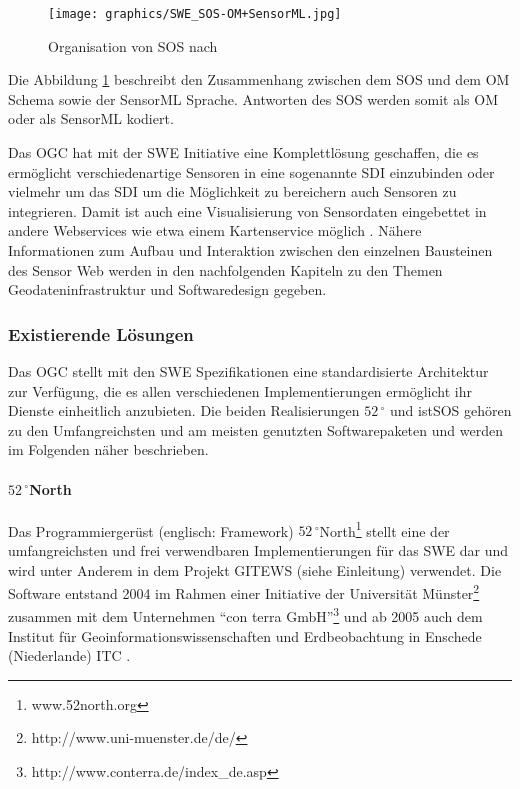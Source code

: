 \citep{botts_ogc_2008}\citep{woolf_gigas_2008}\citep{kunkel_teodoor:_2012}\citep{walkowski_sensor_2008}

\begin{figure}[H]
	\centering
 	 \texttt{[image: graphics/SWE\_SOS-OM+SensorML.jpg]} 
	\caption{Organisation von SOS nach \citep{ansorge_web_2012}}
	 \label{fig:swe_sos-om+sml}
\end{figure}

Die Abbildung \ref{fig:swe_sos-om+sml} beschreibt den Zusammenhang zwischen dem \gls{SOS} und dem \gls{OM} Schema sowie der \gls{SensorML} Sprache. Antworten des \gls{SOS} werden somit als \gls{OM} oder als \gls{SensorML} kodiert.

Das \gls{OGC} hat mit der \gls{SWE} Initiative eine Komplettlösung geschaffen, die es ermöglicht verschiedenartige Sensoren in eine sogenannte  \gls{SDI} einzubinden oder vielmehr um das \gls{SDI} um die Möglichkeit zu bereichern auch Sensoren zu integrieren. Damit ist auch eine Visualisierung von Sensordaten eingebettet in andere Webservices wie etwa einem Kartenservice möglich \citep{broring_new_2011}\citep{walkowski_sensor_2008}. Nähere Informationen zum Aufbau und Interaktion zwischen den einzelnen Bausteinen des Sensor Web werden in den nachfolgenden Kapiteln zu den Themen Geodateninfrastruktur und Softwaredesign gegeben.


\subsubsection{Existierende Lösungen}
Das \gls{OGC} stellt mit den \gls{SWE} Spezifikationen eine standardisierte Architektur zur Verfügung, die es allen verschiedenen Implementierungen ermöglicht ihr Dienste einheitlich anzubieten. Die beiden Realisierungen $52\,^{\circ}$ und istSOS gehören zu den Umfangreichsten und am meisten genutzten Softwarepaketen und werden im Folgenden näher beschrieben.


\paragraph{$52\,^{\circ}$North}
Das Programmiergerüst (englisch: Framework) $52\,^{\circ}$North\footnote{www.52north.org} stellt eine der umfangreichsten und frei verwendbaren Implementierungen für das \gls{SWE} dar und wird unter Anderem in dem Projekt \gls{GITEWS} (siehe Einleitung) verwendet. Die Software entstand 2004 im Rahmen einer Initiative der Universität Münster\footnote{http://www.uni-muenster.de/de/} zusammen mit dem Unternehmen ``con terra GmbH''\footnote{http://www.conterra.de/index\_de.asp} und ab 2005 auch dem Institut für Geoinformationswissenschaften und Erdbeobachtung in Enschede (Niederlande) \gls{ITC} \citep{botts_ogc_2008}\citep{kraak_what_2005}. 

